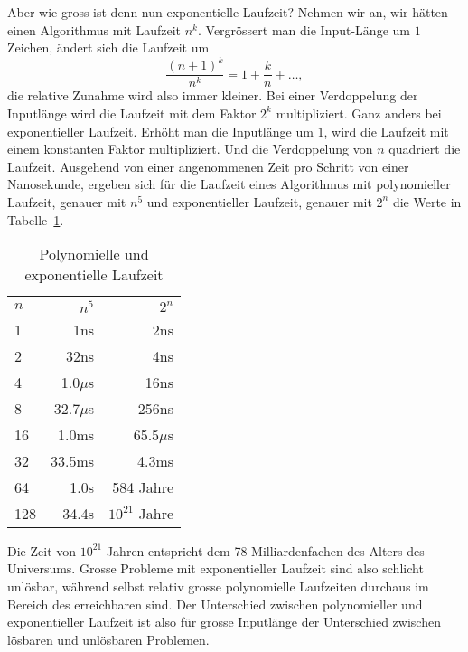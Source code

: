 Aber wie gross ist denn nun exponentielle Laufzeit?
Nehmen wir an,
wir hätten einen Algorithmus mit Laufzeit $n^k$. Vergrössert
man die Input-Länge um $1$ Zeichen, ändert sich die Laufzeit um
\[
\frac{(n+1)^k}{n^k}
=
1+\frac{k}{n} +\dots,
\]
die relative Zunahme wird also immer kleiner. Bei einer Verdoppelung
der Inputlänge wird die Laufzeit mit dem Faktor $2^k$ multipliziert.
Ganz anders bei exponentieller Laufzeit.
Erhöht man die Inputlänge um $1$, wird die Laufzeit mit einem
konstanten Faktor multipliziert. Und die Verdoppelung von $n$
quadriert die Laufzeit.
Ausgehend von einer angenommenen
Zeit pro Schritt von einer Nanosekunde, ergeben sich
für die Laufzeit eines Algorithmus
mit polynomieller Laufzeit, genauer mit $n^5$ und exponentieller Laufzeit,
genauer mit $2^n$ die Werte in Tabelle~\ref{laufzeittabelle}.
\begin{table}
\begin{center}
\begin{tabular}{|l|rr|}
\hline
$n$&$n^5$&$2^n$\\
\hline
  1&             1ns&             2ns\\
  2&            32ns&             4ns\\
  4&       1.0$\mu$s&            16ns\\
  8&      32.7$\mu$s&           256ns\\
 16&           1.0ms&      65.5$\mu$s\\
 32&          33.5ms&           4.3ms\\
 64&            1.0s&       584 Jahre\\
128&           34.4s& $10^{21}$ Jahre\\
\hline
\end{tabular}
\end{center}
\caption{Polynomielle und exponentielle Laufzeit\label{laufzeittabelle}}
\end{table}
Die Zeit von $10^{21}$ Jahren entspricht dem 78 Milliardenfachen des
Alters des Universums. Grosse Probleme mit exponentieller Laufzeit
sind also schlicht unlösbar, während selbst relativ grosse
polynomielle Laufzeiten durchaus im Bereich des erreichbaren sind.
Der Unterschied zwischen polynomieller und exponentieller Laufzeit
ist also für grosse Inputlänge der Unterschied zwischen lösbaren und
unlösbaren Problemen.

